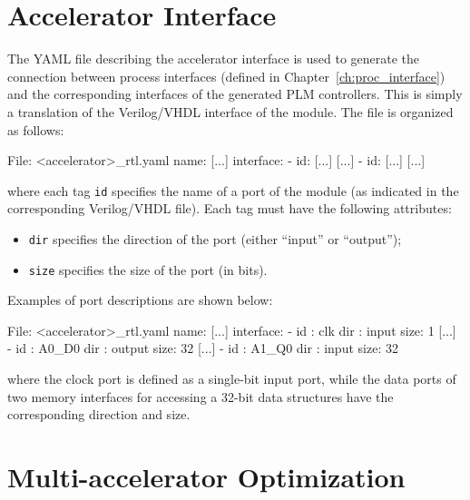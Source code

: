 \section{Accelerator Interface}\label{sec:interface}

The YAML file describing the accelerator interface is used to generate the
connection between process interfaces (defined in
Chapter~\ref{ch:proc_interface}) and the corresponding interfaces of
the generated PLM controllers. This is simply a translation of the
Verilog/VHDL interface of the module.
The file is organized as follows:
\begin{myxml}{File: <accelerator>\_rtl.yaml}
name: [...]
interface:
   - id: [...]
     [...]
   - id: [...]
     [...]
\end{myxml}
\noindent where each tag {\tt id} specifies the name of a port of the module (as indicated in the
corresponding Verilog/VHDL file). Each tag must have the following attributes:
\begin{itemize}
\item {\tt dir} specifies the direction of the port (either ``input'' or ``output'');
\item {\tt size} specifies the size of the port (in bits).
\end{itemize}

Examples of port descriptions are shown below:
\begin{myxml}{File: <accelerator>\_rtl.yaml}
name: [...]
interface:
   - id  : clk
     dir : input
     size: 1 
   [...]
   - id  : A0_D0
     dir : output
     size: 32 
   [...]
   - id  : A1_Q0
     dir : input
     size: 32
\end{myxml}
\noindent where the clock port is defined as a single-bit input port, while the data ports of two memory interfaces for accessing a 32-bit data structures have the corresponding direction and size.

\section{Multi-accelerator Optimization}\label{sec:multi-acc}

